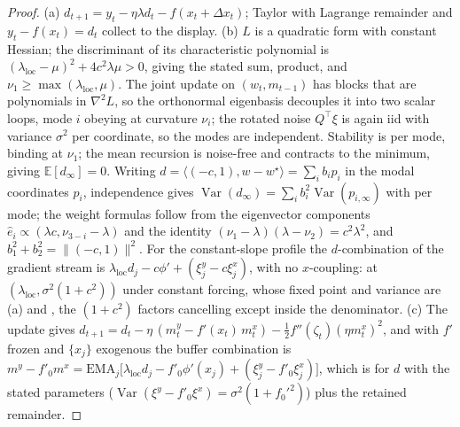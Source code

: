 \documentclass[11pt,a4paper]{article}
\theoremstyle{remark}
\begin{document}
\begin{proof}
(a) $d_{t+1}=y_t-\eta\lambda d_t-f(x_t+\Delta x_t)$; Taylor with Lagrange remainder and $y_t-f(x_t)=d_t$ collect to the display.
(b) $L$ is a quadratic form with constant Hessian; the discriminant of its characteristic polynomial is $(\lambda_{\mathrm{loc}}-\mu)^2+4c^2\lambda\mu>0$, giving the stated sum, product, and $\nu_1\ge\max(\lambda_{\mathrm{loc}},\mu)$.
The joint update on $(w_t,m_{t-1})$ has blocks that are polynomials in $\nabla^2L$, so the orthonormal eigenbasis decouples it into two scalar loops, mode $i$ obeying  at curvature $\nu_i$; the rotated noise $Q^\top\xi$ is again iid with variance $\sigma^2$ per coordinate, so the modes are independent.
Stability is  per mode, binding at $\nu_1$; the mean recursion is noise-free and contracts to the minimum, giving $\mathbb{E}[d_\infty]=0$.
Writing $d=\langle(-c,1),w-w^\star\rangle=\sum_ib_ip_i$ in the modal coordinates $p_i$, independence gives $\operatorname{Var}(d_\infty)=\sum_ib_i^2\operatorname{Var}(p_{i,\infty})$ with  per mode; the weight formulas follow from the eigenvector components $\hat e_i\propto(\lambda c,\nu_{3-i}-\lambda)$ and the identity $(\nu_1-\lambda)(\lambda-\nu_2)=c^2\lambda^2$, and $b_1^2+b_2^2=\lVert(-c,1)\rVert^2$.
For the constant-slope profile the $d$-combination of the gradient stream is $\lambda_{\mathrm{loc}}d_j-c\phi'+(\xi^y_j-c\xi^x_j)$, with no $x$-coupling:  at $(\lambda_{\mathrm{loc}},\sigma^2(1+c^2))$ under constant forcing, whose fixed point and variance are (a) and , the $(1+c^2)$ factors cancelling except inside the denominator.
(c) The update gives $d_{t+1}=d_t-\eta\,(m^y_t-f'(x_t)\,m^x_t)-\tfrac12 f''(\zeta_t)(\eta m^x_t)^2$, and with $f'$ frozen and $\{x_j\}$ exogenous the buffer combination is $m^y-f'_0m^x=\mathrm{EMA}_j\bigl[\lambda_{\mathrm{loc}}d_j-f'_0\phi'(x_j) +(\xi^y_j-f'_0\xi^x_j)\bigr]$, which is  for $d$ with the stated parameters ($\operatorname{Var}(\xi^y-f'_0\xi^x)=\sigma^2(1+f_0'^2)$) plus the retained remainder.
\end{proof}
\end{document}
